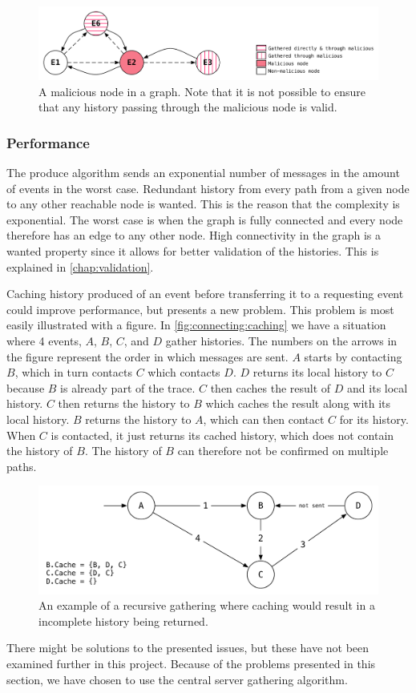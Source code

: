 	\begin{figure}[H]
		\centering
		\includegraphics[width=\textwidth]{4connect/images/recursive-evil-node.pdf}
		\caption{A malicious node in a graph. Note that it is not possible to ensure that any history passing through the malicious node is valid.}
		\label{fig:connecting:recursive-evil-node}
	\end{figure}
	
	\subsubsection{Performance}
	The produce algorithm sends an exponential number of messages in the amount of events in the worst case. Redundant history from every path from a given node to any other reachable node is wanted. This is the reason that the complexity is exponential. The worst case is when the graph is fully connected and every node therefore has an edge to any other node. High connectivity in the graph is a wanted property since it allows for better validation of the histories. This is explained in \autoref{chap:validation}.
	
	\newpar Caching history produced of an event before transferring it to a requesting event could improve performance, but presents a new problem. This problem is most easily illustrated with a figure. In \autoref{fig:connecting:caching} we have a situation where 4 events, $A$, $B$, $C$, and $D$ gather histories. The numbers on the arrows in the figure represent the order in which messages are sent. $A$ starts by contacting $B$, which in turn contacts $C$ which contacts $D$. $D$ returns its local history to $C$ because $B$ is already part of the trace. $C$ then caches the result of $D$ and its local history. $C$ then returns the history to $B$ which caches the result along with its local history. $B$ returns the history to $A$, which can then contact $C$ for its history. When $C$ is contacted, it just returns its cached history, which does not contain the history of $B$. The history of $B$ can therefore not be confirmed on multiple paths.
	
	\begin{figure}[H]
		\centering
		\includegraphics[height=0.20\textheight]{4connect/images/caching.pdf}
		\caption{An example of a recursive gathering where caching would result in a incomplete history being returned.}
		\label{fig:connecting:caching}
	\end{figure}
	
	\noindent There might be solutions to the presented issues, but these have not been examined further in this project. Because of the problems presented in this section, we have chosen to use the central server gathering algorithm.